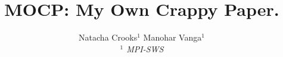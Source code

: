 

\newif \ifDraft\Drafttrue

\ifDraft
  \newcommand{\Comment}[1]{\textbf{\textsl{#1}}}
\else
  \newcommand{\Comment}[1]{\relax}
\fi

\newcommand{\gernot}[1]{\Comment{#1 [gernot]}}


\title{\textbf{
MOCP: My Own Crappy Paper. 
}}

\author{
Natacha Crooks$^1$ \quad
Manohar Vanga$^1$
\\ \emph{$^1$ MPI-SWS}
}
\date{\vspace{-8pt}}




\maketitle






%


%
\fontsize{8}{8.2}
\selectfont


\normalsize

